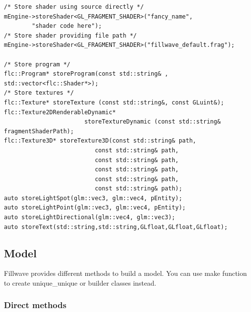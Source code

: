 \documentclass{article}
\begin{document}
\begin{lstlisting}
/* Store shader using source directly */
mEngine->storeShader<GL_FRAGMENT_SHADER>("fancy_name",
		"shader code here");
/* Store shader providing file path */
mEngine->storeShader<GL_FRAGMENT_SHADER>("fillwave_default.frag");

/* Store program */
flc::Program* storeProgram(const std::string& , std::vector<flc::Shader*>);
/* Store textures */
flc::Texture* storeTexture (const std::string&, const GLuint&);
flc::Texture2DRenderableDynamic*
                       storeTextureDynamic (const std::string& fragmentShaderPath);
flc::Texture3D* storeTexture3D(const std::string& path,
                          const std::string& path,
                          const std::string& path,
                          const std::string& path,
                          const std::string& path,
                          const std::string& path);
auto storeLightSpot(glm::vec3, glm::vec4, pEntity);
auto storeLightPoint(glm::vec3, glm::vec4, pEntity);
auto storeLightDirectional(glm::vec4, glm::vec3);
auto storeText(std::string,std::string,GLfloat,GLfloat,GLfloat);
\end{lstlisting}

\newpage

\subsection{Model}\label{sec:Model}
\indent \indent Fillwave provides different methods to build a model. You can use make function to create unique\_unique or builder classes instead.

\subsubsection{Direct methods}\label{sec:directCreation}
\end{document}
